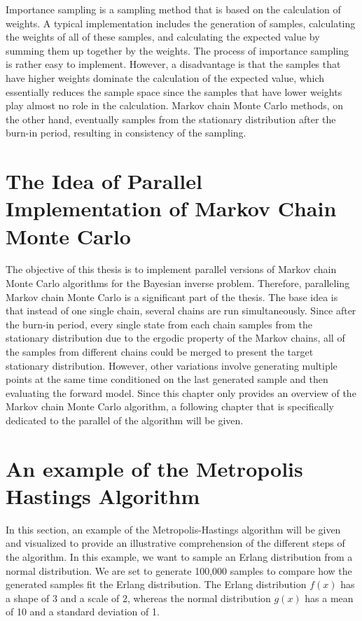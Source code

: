 Importance sampling is a sampling method that is based on the calculation of weights. A typical implementation includes the generation of samples, calculating the weights of all of these samples, and calculating the expected value by summing them up together by the weights.\cite{ImportanceSampling} The process of importance sampling is rather easy to implement. However, a disadvantage is that the samples that have higher weights dominate the calculation of the expected value, which essentially reduces the sample space since the samples that have lower weights play almost no role in the calculation. Markov chain Monte Carlo methods, on the other hand, eventually samples from the stationary distribution after the burn-in period, resulting in consistency of the sampling.\cite{ComparisonSampling}

\section{The Idea of Parallel Implementation of Markov Chain Monte Carlo}
The objective of this thesis is to implement parallel versions of Markov chain Monte Carlo algorithms for the Bayesian inverse problem. Therefore, paralleling Markov chain Monte Carlo is a significant part of the thesis. The base idea is that instead of one single chain, several chains are run simultaneously.\cite{base_parallel} Since after the burn-in period, every single state from each chain samples from the stationary distribution due to the ergodic property of the Markov chains,\cite{ergodicity} all of the samples from different chains could be merged to present the target stationary distribution. However, other variations involve generating multiple points at the same time conditioned on the last generated sample and then evaluating the forward model.\cite{gpmh_broshure} Since this chapter only provides an overview of the Markov chain Monte Carlo algorithm, a following chapter that is specifically dedicated to the parallel of the algorithm will be given.

\section{An example of the Metropolis Hastings Algorithm}
In this section, an example of the Metropolis-Hastings algorithm will be given and visualized to provide an illustrative comprehension of the different steps of the algorithm. In this example, we want to sample an Erlang distribution from a normal distribution. We are set to generate 100,000 samples to compare how the generated samples fit the Erlang distribution. The Erlang distribution $f(x)$ has a shape of 3 and a scale of 2, whereas the normal distribution $g(x)$ has a mean of 10 and a standard deviation of 1.

